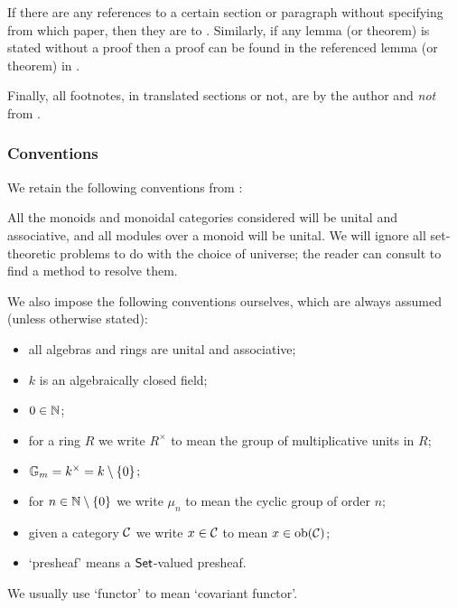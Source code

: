         If there are any references to a certain section or paragraph without specifying from which paper, then they are to \cite{Toen:2005wxa}.
        Similarly, if any lemma (or theorem) is stated without a proof then a proof can be found in the referenced lemma (or theorem) in \cite{Toen:2005wxa}.

        Finally, all footnotes, in translated sections or not, are by the author and \emph{not} from \cite{Toen:2005wxa}.


    \subsubsection{Conventions} %
    \label{ssub:conventions}

        We retain the following conventions from \cite{Toen:2005wxa}:
        \begin{translation}{1}{-2}
            All the monoids and monoidal categories considered will be unital and associative, and all modules over a monoid will be unital.
            We will ignore all set-theoretic problems to do with the choice of universe; the reader can consult \cite{Toen:2005er,Toen:2008wy} to find a method to resolve them.
        \end{translation}

        We also impose the following conventions ourselves, which are always assumed (unless otherwise stated):
        \begin{itemize}
            \item all algebras and rings are unital and associative;
            \item $k$ is an algebraically closed field;
            \item $0\in\mathbb{N}$;
            \item for a ring $R$ we write $R^\times$ to mean the group of multiplicative units in $R$;
            \item $\mathbb{G}_m=k^\times=k\setminus\{0\}$;
            \item for $n\in\mathbb{N}\setminus\{0\}$ we write $\mu_n$ to mean the cyclic group of order $n$;
            \item given a category $\mathcal{C}$ we write $x\in\mathcal{C}$ to mean $x\in\mathrm{ob}(\mathcal{C})$;
            \item `presheaf' means a $\mathsf{Set}$-valued presheaf.
        \end{itemize}
        We usually use `functor' to mean `covariant functor'.



    

    

